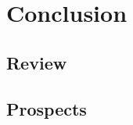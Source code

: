 \chapter*{Conclusion}
\label{chap:conclusion}

\section*{Review}
\lipsum[3]


\section*{Prospects}
\lipsum[3]